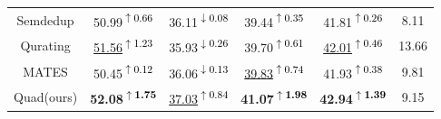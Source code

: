 \documentclass{article} %
\begin{document}
\begin{table}[t]
\begin{center}
{\begin{tabular}{cccccc}
Semdedup                                                         &         50.99\textsuperscript{\colorbox{green!15}{\textcolor{black}{$\uparrow$0.66}}}          &            36.11\textsuperscript{\colorbox{red!15}{\textcolor{black}{$\downarrow$0.08}}}           &            39.44\textsuperscript{\colorbox{green!15}{\textcolor{black}{$\uparrow$0.35}}}          &     41.81\textsuperscript{\colorbox{green!15}{\textcolor{black}{$\uparrow$0.26}}} & 8.11   \\ 

Qurating                                                      &           \underline{51.56}\textsuperscript{\colorbox{green!15}{\textcolor{black}{$\uparrow$1.23}}}        &           35.93\textsuperscript{\colorbox{red!15}{\textcolor{black}{$\downarrow$0.26}}}            &             39.70\textsuperscript{\colorbox{green!15}{\textcolor{black}{$\uparrow$0.61}}}          &    \underline{42.01}\textsuperscript{\colorbox{green!15}{\textcolor{black}{$\uparrow$0.46}}} &13.66   \\ 

MATES                                                         &     50.45\textsuperscript{\colorbox{green!15}{\textcolor{black}{$\uparrow$0.12}}}              &       36.06\textsuperscript{\colorbox{red!15}{\textcolor{black}{$\downarrow$0.13}}}                &      \underline{39.83}\textsuperscript{\colorbox{green!15}{\textcolor{black}{$\uparrow$0.74}}}                 &   41.93\textsuperscript{\colorbox{green!15}{\textcolor{black}{$\uparrow$0.38}}}    &9.81  \\ \midrule

Quad(ours)                                                          &         \textbf{52.08\textsuperscript{\colorbox{green!15}{\textcolor{black}{$\uparrow$1.75}}}}          &           \underline{37.03}\textsuperscript{\colorbox{green!15}{\textcolor{black}{$\uparrow$0.84}}}            &           \textbf{41.07\textsuperscript{\colorbox{green!15}{\textcolor{black}{$\uparrow$1.98}}}}            &     \textbf{42.94\textsuperscript{\colorbox{green!15}{\textcolor{black}{$\uparrow$1.39}}}} &9.15 \\ \bottomrule
\end{tabular}}

\end{center}
\label{table1}
\end{table}
\end{document}
